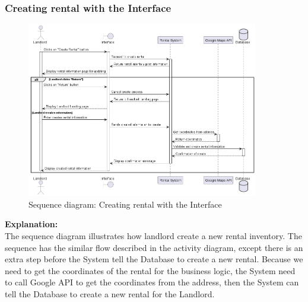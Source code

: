\subsubsection{Creating rental with the Interface}
\begin{figure}[H]
    \centering
    \includegraphics[width=0.9\textwidth]{Images/Sequence/seq_diag_create_rental_inventory.png}
    \caption{Sequence diagram: Creating rental with the Interface}
    \label{fig:seq-diag-create-chat-bot}
\end{figure}
\noindent \textbf{Explanation:}\\
The sequence diagram illustrates how landlord create a new rental inventory. The sequence has the similar flow described in the activity diagram, except there is an extra step before the System tell the Database to create a new rental. Because we need to get the coordinates of the rental for the business logic, the System need to call Google API to get the coordinates from the address, then the System can tell the Database to create a new rental for the Landlord.


\newpage
